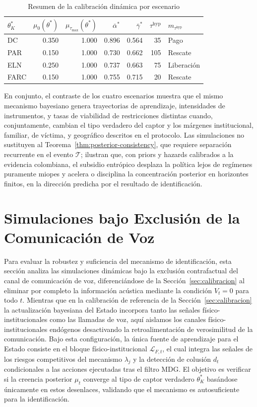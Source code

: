 \documentclass[review,authoryear,12pt]{elsarticle}
\theoremstyle{plain}
\theoremstyle{definition}
\newcommand{\1}{\mathbf{1}}
\begin{document}
\begin{table}[htbp]
\centering
\caption{Resumen de la calibración dinámica por escenario}
\label{tab:calibracion-resumen}
\small
\begin{tabular}{lrrrrrl}
\toprule
$\theta_K^\ast$ & $\mu_0(\theta^\ast)$ & $\mu_{\tau_{\max}}(\theta^\ast)$ & $\bar{\alpha}^\ast$ & $\bar{\gamma}^\ast$ & $\tau^{\mathrm{hyp}}$ & $m_{\tau^{\mathrm{hyp}}}$ \\
\midrule
DC & 0.350 & 1.000 & 0.896 & 0.564 & 35 & Pago \\
PAR & 0.150 & 1.000 & 0.730 & 0.662 & 105 & Rescate \\
ELN & 0.250 & 1.000 & 0.737 & 0.663 & 75 & Liberación \\
FARC & 0.150 & 1.000 & 0.755 & 0.715 & 20 & Rescate \\
\bottomrule
\end{tabular}
\end{table}En conjunto, el contraste de los cuatro escenarios muestra que el mismo mecanismo bayesiano genera trayectorias de aprendizaje, intensidades de instrumentos, y tasas de viabilidad de restricciones distintas cuando, conjuntamente, cambian el tipo verdadero del captor y los márgenes institucional, familiar, de víctima, y geográfico descritos en el protocolo. Las simulaciones no sustituyen al Teorema~\ref{thm:posterior-consistency}, que requiere separación recurrente en el evento $\mathcal{T}$; ilustran que, con priors y hazards calibrados a la evidencia colombiana, el subsidio entrópico desplaza la política lejos de regímenes puramente miopes y acelera o disciplina la concentración posterior en horizontes finitos, en la dirección predicha por el resultado de identificación.

\clearpage

\section{Simulaciones bajo Exclusión de la Comunicación de Voz}\label{sec:no-voice}

Para evaluar la robustez y suficiencia del mecanismo de identificación, esta sección analiza las simulaciones dinámicas bajo la exclusión contrafactual del canal de comunicación de voz, diferenciándose de la Sección~\ref{sec:calibracion} al eliminar por completo la información acústica mediante la condición $V_t = 0$ para todo $t$. Mientras que en la calibración de referencia de la Sección~\ref{sec:calibracion} la actualización bayesiana del Estado incorpora tanto las señales físico-institucionales como las llamadas de voz, aquí aislamos los canales físico-institucionales endógenos desactivando la retroalimentación de verosimilitud de la comunicación. Bajo esta configuración, la única fuente de aprendizaje para el Estado consiste en el bloque físico-institucional $\mathcal{L}_{F,t}$, el cual integra las señales de los riesgos competitivos del mecanismo $\lambda_j$ y la detección de colusión $d_t$ condicionales a las acciones ejecutadas tras el filtro MDG. El objetivo es verificar si la creencia posterior $\mu_t$ converge al tipo de captor verdadero $\theta_K^\ast$ basándose únicamente en estos desenlaces, validando que el mecanismo es autosuficiente para la identificación.
\end{document}
